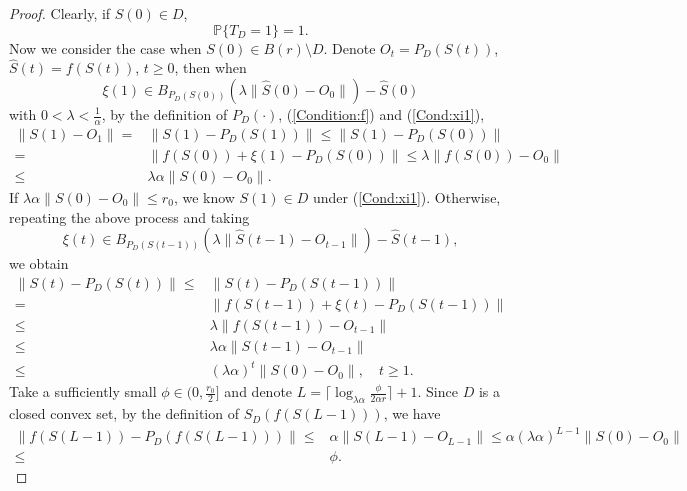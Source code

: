 \documentclass[10pt,a4paper]{amsart}
\begin{document}
\begin{proof}
Clearly, if $S(0)\in D$,
\begin{equation}\label{Equa:Tequ1}
  \mathbb{P}\{T_D=1\}=1.
\end{equation}
Now we consider the case when $S(0)\in B(r)\setminus D$. Denote $O_t=P_D({S(t)})$, $\hat{S}(t)=f(S(t))$, $t\geq 0$, then when
\begin{equation}\label{Cond:xi1}
  \xi(1)\in B_{P_D(S(0))}(\lambda \|\hat{S}(0)-O_0\|)-\hat{S}(0)
\end{equation}
with $0<\lambda< \frac{1}{\alpha}$, by the definition of $P_D(\cdot)$, (\ref{Condition:f}) and (\ref{Cond:xi1}),
\begin{equation}\label{Equa:disderea}
\begin{split}
  \| S(1)-O_1\|=&\| S(1)-P_D(S(1))\|\leq \| S(1)-P_D(S(0))\|\\
  =&\| f(S(0))+\xi(1)-P_D(S(0))\|\leq \lambda\| f(S(0))-O_0\|\\
  \leq& \lambda\alpha\| S(0)-O_0\|.
\end{split}
\end{equation}
If $\lambda\alpha\| S(0)-O_0\|\leq r_0$, we know $S(1)\in D$ under (\ref{Cond:xi1}). Otherwise, repeating the above process and taking
\begin{equation*}
  \xi(t)\in B_{P_D(S(t-1))}(\lambda \| \hat{S}(t-1)-O_{t-1}\|)-\hat{S}(t-1),
\end{equation*}
we obtain
\begin{equation*}
\begin{split}
  \| S(t)-P_D(S(t))\|\leq&\| S(t)-P_D(S(t-1))\|\\
  =&\| f(S(t-1))+\xi(t)-P_D(S(t-1))\|\\
  \leq &\lambda \| f(S(t-1))-O_{t-1}\|\\
  \leq &\lambda\alpha\| S(t-1)-O_{t-1}\|\\
  \leq& (\lambda\alpha)^t\| S(0)-O_0\|,\quad t\geq 1.
\end{split}
\end{equation*}
Take a sufficiently small $\phi\in(0, \frac{r_0}{2}]$ and denote $L=\lceil\log_{\lambda\alpha} \frac{\phi}{2\alpha r}\rceil+1$.
Since $D$ is a closed convex set, by the definition of $S_D(f(S(L-1)))$, we have
\begin{equation}\label{Equa:distdelta}
\begin{split}
  \| f(S(L-1))-P_D(f(S(L-1)))\|\leq&\alpha\| S(L-1)-O_{L-1}\|\leq \alpha(\lambda\alpha)^{L-1}\| S(0)-O_0\|\\
  \leq&\phi.
  \end{split}

\end{equation}
\end{proof}
\end{document}
